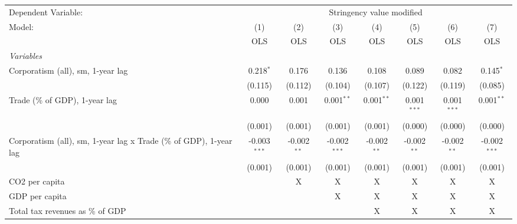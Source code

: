 
\begingroup
\centering
\begin{tabular}{lccccccc}
   \toprule
   Dependent Variable: & \multicolumn{7}{c}{Stringency value modified}\\
   Model:                                                             & (1)            & (2)           & (3)            & (4)           & (5)           & (6)           & (7)\\  
                                                                      &  OLS           & OLS           & OLS            & OLS           & OLS           & OLS           & OLS\\  
   \midrule
   \emph{Variables}\\
   Corporatism (all), sm, 1-year lag                                  & 0.218$^{*}$    & 0.176         & 0.136          & 0.108         & 0.089         & 0.082         & 0.145$^{*}$\\   
                                                                      & (0.115)        & (0.112)       & (0.104)        & (0.107)       & (0.122)       & (0.119)       & (0.085)\\   
   Trade (\% of GDP), 1-year lag                                      & 0.000          & 0.001         & 0.001$^{**}$   & 0.001$^{**}$  & 0.001$^{***}$ & 0.001$^{***}$ & 0.001$^{**}$\\   
                                                                      & (0.001)        & (0.001)       & (0.001)        & (0.001)       & (0.000)       & (0.000)       & (0.000)\\   
   Corporatism (all), sm, 1-year lag x Trade (\% of GDP), 1-year lag  & -0.003$^{***}$ & -0.002$^{**}$ & -0.002$^{***}$ & -0.002$^{**}$ & -0.002$^{**}$ & -0.002$^{**}$ & -0.002$^{***}$\\   
                                                                      & (0.001)        & (0.001)       & (0.001)        & (0.001)       & (0.001)       & (0.001)       & (0.001)\\   
   CO2 per capita                                                     &                & X             & X              & X             & X             & X             & X\\  
   GDP per capita                                                     &                &               & X              & X             & X             & X             & X\\  
   Total tax revenues as \% of GDP                                    &                &               &                & X             & X             & X             & X\\  

\end{tabular}
